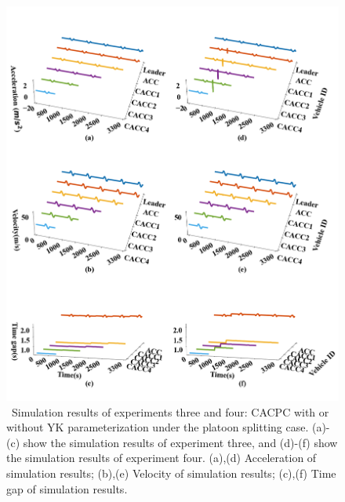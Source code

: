 \documentclass[trsc,nonblindrev]{informs3} %
\begin{document}
\begin{figure}
    \centering
    \includegraphics[width=14cm]{figs/c_split.png}
    \caption{~Simulation results of experiments three and four: CACPC with or without YK parameterization under the platoon splitting case. (a)-(c) show the simulation results of experiment three, and (d)-(f) show the simulation results of experiment four. (a),(d) Acceleration of simulation results; (b),(e) Velocity of simulation results; (c),(f) Time gap of simulation results.}
    \label{new3}
\end{figure}
\end{document}
